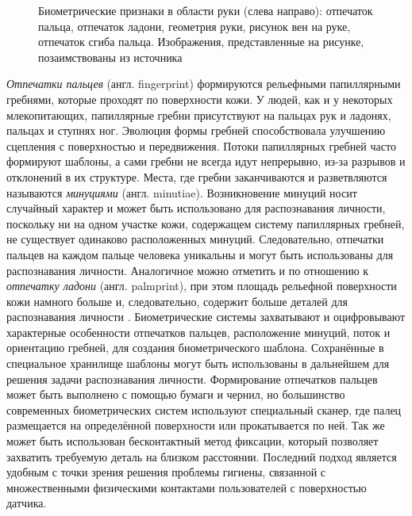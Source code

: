 \documentclass[12pt]{book}
\begin{document}
\begin{figure}[]
\caption{Биометрические признаки в области руки (слева направо): отпечаток пальца, отпечаток ладони, геометрия руки, рисунок вен на руке, отпечаток сгиба пальца. Изображения, представленные на рисунке, позаимствованы из источника \cite{unar_2014}}
\label{fig:figure_1_2}
\end{figure}

\large{\textit{Отпечатки пальцев} (англ. fingerprint) формируются рельефными папиллярными гребнями, которые проходят по поверхности кожи. У людей, как и у некоторых млекопитающих, папиллярные гребни присутствуют на пальцах рук и ладонях, пальцах и ступнях ног. Эволюция формы гребней способствовала улучшению сцепления с поверхностью и передвижения. Потоки папиллярных гребней часто формируют шаблоны, а сами гребни не всегда идут непрерывно, из-за разрывов и отклонений в их структуре. Места, где гребни заканчиваются и разветвляются называются \textit{минуциями} (англ. minutiae). Возникновение минуций носит случайный характер и может быть использовано для распознавания личности, поскольку ни на одном участке кожи, содержащем систему папиллярных гребней, не существует одинаково расположенных минуций. Следовательно, отпечатки пальцев на каждом пальце человека уникальны и могут быть использованы для распознавания личности. Аналогичное можно отметить и по отношению к \textit{отпечатку ладони} (англ. palmprint), при этом площадь рельефной поверхности кожи намного больше и, следовательно, содержит больше деталей для распознавания личности \cite{unar_2014, minaee_2023, gao_2025}. Биометрические системы захватывают и оцифровывают характерные особенности отпечатков пальцев, расположение минуций, поток и ориентацию гребней, для создания биометрического шаблона. Сохранённые в специальное хранилище шаблоны могут быть использованы в дальнейшем для решения задачи распознавания личности. Формирование отпечатков пальцев может быть выполнено с помощью бумаги и чернил, но большинство современных биометрических систем используют специальный сканер, где палец размещается на определённой поверхности или прокатывается по ней. Так же может быть использован бесконтактный метод фиксации, который позволяет захватить требуемую деталь на близком расстоянии. Последний подход является удобным с точки зрения решения проблемы гигиены, связанной с множественными физическими контактами пользователей с поверхностью датчика.} 
\end{document}
